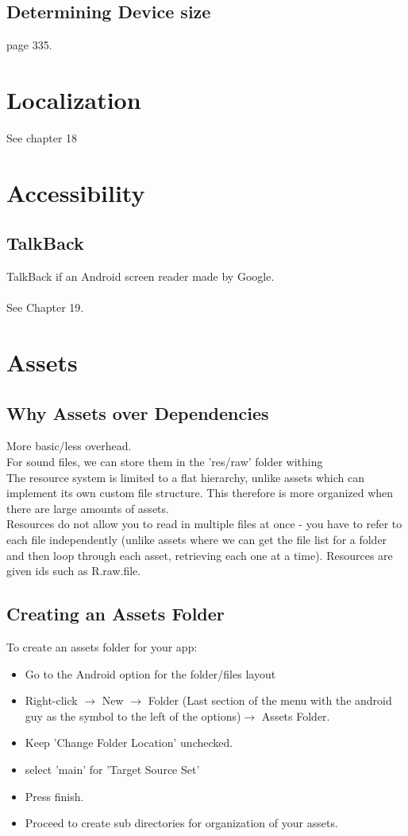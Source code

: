 \documentclass[]{article}
\begin{document}
\subsection{Determining Device size}
page 335.

\section{Localization}
See chapter 18

\section{Accessibility}
\subsection{TalkBack}
TalkBack if an Android screen reader made by Google.
\\\\
See Chapter 19.

\section{Assets}
\subsection{Why Assets over Dependencies}
More basic/less overhead.
\\
For sound files, we can store them in the 'res/raw' folder withing 
\\
The resource system is limited to a flat hierarchy, unlike assets which can implement its own custom file structure.  This therefore is more organized when there are large amounts of assets.
\\
Resources do not allow you to read in multiple files at once - you have to refer to each file independently (unlike assets where we can get the file list for a folder and then  loop through each asset, retrieving each one at a time).  Resources are given ids such as R.raw.file.


\subsection{Creating an Assets Folder}
To create an assets folder for your app:
\begin{itemize}
	\item Go to the Android option for the folder/files layout 
	\item Right-click $\rightarrow$ New $\rightarrow$ Folder (Last section of the menu with the android guy as the symbol to the left of the options)$\rightarrow$ Assets Folder.
	\item Keep 'Change Folder Location' unchecked.
	\item select 'main' for 'Target Source Set'
	\item Press finish.
	\item Proceed to create sub directories for organization of your assets.
\end{itemize}
\end{document}
